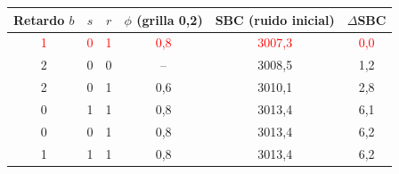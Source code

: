 \begin{tabular}{cccccc}
\toprule
Retardo $b$ & $s$ & $r$ & $\phi$ (grilla 0,2) & SBC (ruido inicial) & $\Delta$SBC
\\ \midrule
\textcolor{red}{1} & \textcolor{red}{0} & \textcolor{red}{1} & \textcolor{red}{0{,}8} & \textcolor{red}{3007{,}3} & \textcolor{red}{0{,}0} \\
2 & 0 & 0 & -- & 3008{,}5 & 1{,}2 \\
2 & 0 & 1 & 0{,}6 & 3010{,}1 & 2{,}8 \\
0 & 1 & 1 & 0{,}8 & 3013{,}4 & 6{,}1 \\
0 & 0 & 1 & 0{,}8 & 3013{,}4 & 6{,}2 \\
1 & 1 & 1 & 0{,}8 & 3013{,}4 & 6{,}2 \\
\bottomrule
\end{tabular}
